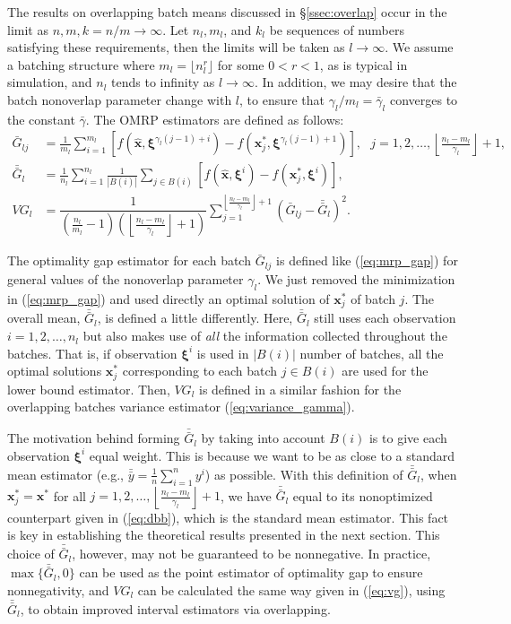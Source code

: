 \documentclass[12pt]{article}
\newcommand{\x}{\mathbf{x}}
\newcommand{\xh}{{\hat{\x}}}
\newcommand{\xs}{\x^*}
\newcommand{\xit}{\boldsymbol{\xi}}
\newcommand{\xiti}{\xit^i}
\newcommand{\nbl}{\left\lfloor\tfrac{n_l-m_l}{\gamma_l}\right\rfloor+1}
\newcommand{\gammab}{\bar{\gamma}}
\newcommand{\gb}{\bar{G}}
\newcommand{\gbb}{\bar{\gb}}
\newcommand{\yb}{\bar{y}}
\newcommand{\ybb}{\bar{\yb}}
\begin{document}
The results on overlapping batch means discussed in \S \ref{ssec:overlap} occur in the limit as $n, m, k=n/m \rightarrow \infty$.  
Let $n_l, m_l$, and $k_l$ be sequences of numbers satisfying these requirements, then the limits will be taken as $l \rightarrow \infty$.  
We assume a batching structure where $m_l = \lfloor n_l ^r \rfloor$ for some $0<r<1$, as is typical in simulation, and $n_l$ tends to infinity as $l \rightarrow \infty$.  
In addition, we may desire that the batch nonoverlap parameter change with $l$, to ensure that $\gamma_l / m_l = \gammab_l$ converges to the constant $\gammab$.  
The OMRP estimators are defined as follows:
\begin{align}
	\gb_{lj} & = \frac{1}{m_l} \sum_{i=1}^{m_l} \left[ f(\xh,\xit^{\gamma_l(j-1)+i}) - f(\xs_j,\xit^{\gamma_l(j-1)+1}) \right],\ \ \ j = 1, 2, \dots, \nbl, \label{eq:gbar} \\
	\gbb_l & = \frac{1}{n_l} \sum_{i=1}^{n_l} \frac{1}{|B(i)|} \sum_{j \in B(i)} \left[ f(\xh,\xiti) - f(\xs_j,\xiti) \right], \label{eq:gbb} \\
	VG_l & = \dfrac{1}{\left( \tfrac{n_l}{m_l} - 1 \right) \left(\nbl\right)} \sum_{j=1}^{\nbl} (\gb_{lj} - \gbb_l)^2. \label{eq:vg}
\end{align}

The optimality gap estimator for each batch $\gb_{lj}$ is defined like (\ref{eq:mrp_gap}) for general values of the nonoverlap parameter $\gamma_l$.  
We just removed the minimization in (\ref{eq:mrp_gap}) and used directly an optimal solution of $\xs_j$ of batch $j$.  
The overall mean, $\gbb_l$, is defined a little differently.  
Here, $\gbb_l$ still uses each observation $i = 1, 2, \dots, n_l$ but also makes use of {\it all} the information collected throughout the batches.  
That is, if observation $\xiti$ is used in $|B(i)|$ number of batches, all the optimal solutions $\xs_j$ corresponding to each batch $j \in B(i)$ are used for the lower bound estimator.  
Then, $VG_l$ is defined in a similar fashion for the overlapping batches variance estimator (\ref{eq:variance_gamma}).

The motivation behind forming $\gbb_l$ by taking into account $B(i)$ is to give each observation $\xit^i$ equal weight. 
This is because we want to be as close to a standard mean estimator (e.g., $\ybb=\frac{1}{n}\sum_{i=1}^{n} y^i$) as possible.
With this definition of $\gbb_l$, when $\xs_j= \xs$ for all $j= 1, 2, \dots, \nbl$, we have $\gbb_l$ equal to its nonoptimized counterpart given in (\ref{eq:dbb}), which is the standard mean estimator. 
This fact is key in establishing the theoretical results presented in the next section. 
This choice of $\gbb_l$, however, may not be guaranteed to be nonnegative.
In practice, $\max\{\gbb_l,0\}$ can be used as the point estimator of optimality gap to ensure nonnegativity, and $VG_l$ can be calculated the same way given in (\ref{eq:vg}), using $\gbb_l$, to obtain improved interval estimators via overlapping. 
\end{document}
